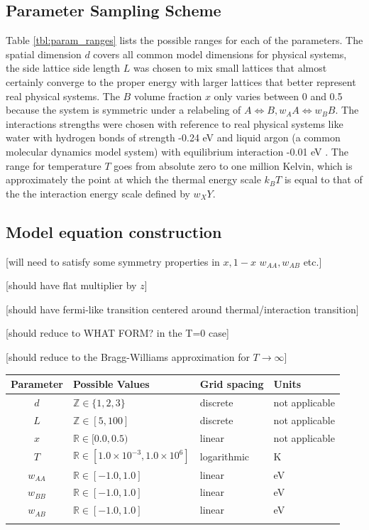 \documentclass[10pt]{article}
\begin{document}
\subsection{Parameter Sampling Scheme}
Table \ref{tbl:param_ranges} lists the possible ranges for each of the parameters.
The spatial dimension $d$ covers all common model dimensions for physical systems, the side lattice side length $L$ was chosen to mix small lattices that almost certainly converge to the proper energy with larger lattices that better represent real physical systems.
The $B$ volume fraction $x$ only varies between 0 and 0.5 because the system is symmetric under a relabeling of $A \iff B, w_AA \iff w_BB$.
The interactions strengths were chosen with reference to real physical systems like water with hydrogen bonds of strength -0.24 eV and liquid argon (a common molecular dynamics model system) with equilibrium interaction -0.01 eV \cite{water} \cite{argon}.
The range for temperature $T$ goes from absolute zero to one million Kelvin, which is approximately the point at which the thermal energy scale $k_B T$ is equal to that of the the interaction energy scale defined by $w_XY$.

\subsection{Model equation construction}
[will need to satisfy some symmetry properties in $x, 1-x$ $w_{AA},w_{AB}$ etc.]

[should have flat multiplier by $z$]

[should have fermi-like transition centered around thermal/interaction transition]

[should reduce to WHAT FORM? in the T=0 case]

[should reduce to the Bragg-Williams approximation for $T \rightarrow \infty$]

\begin{center}
\begin{tabular}{c | l | l | l} 
    \hline
    Parameter & Possible Values & Grid spacing & Units \\  \hline
    $d$ & $\mathbb{Z} \in \{1,2,3\}$ & discrete & not applicable \\ \hline
    $L$ & $\mathbb{Z} \in [5,100]$ & discrete & not applicable \\ \hline
    $x$ & $\mathbb{R} \in [0.0,0.5)$ & linear & not applicable \\ \hline
    $T$ & $\mathbb{R} \in [1.0 \times 10^{-3},1.0 \times 10^6]$ & logarithmic & K \\ \hline
    $w_{AA}$ & $\mathbb{R} \in [-1.0, 1.0]$ & linear & eV \\ \hline
    $w_{BB}$ & $\mathbb{R} \in [-1.0, 1.0]$ & linear & eV \\ \hline
    $w_{AB}$ & $\mathbb{R} \in [-1.0, 1.0]$ & linear & eV \\
    \label{tbl:param_ranges}
\end{tabular}
\end{center}
\end{document}
